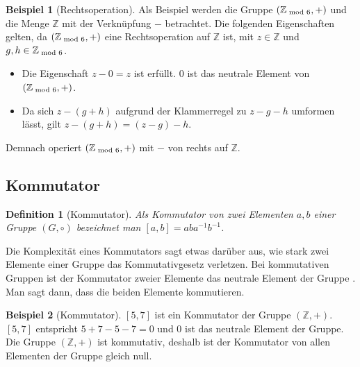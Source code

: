 \documentclass[12pt,a4paper, usenames, dvipsnames]{article}
\theoremstyle{mystyle}
\newtheorem{definition}{Definition}
\theoremstyle{definition}
\newtheorem{bsp}{Beispiel}[definition]
\begin{document}
\begin{bsp}[Rechtsoperation]

Als Beispiel werden die Gruppe $(\mathbb{Z}_{\hspace*{-0.3em}\mod 6}, +)$ und die Menge $\mathbb{Z}$ mit der Verknüpfung $-$ betrachtet. Die folgenden Eigenschaften gelten, da $(\mathbb{Z}_{\hspace*{-0.3em}\mod 6}, +)$ eine Rechtsoperation auf $\mathbb{Z}$ ist, mit $z \in  \mathbb{Z}$ und $g,h \in \mathbb{Z}_{\hspace*{-0.3em}\mod 6}$.
\begin{itemize}
\item Die Eigenschaft $z - 0 = z$ ist erfüllt. $0$ ist das neutrale Element von $(\mathbb{Z}_{\hspace*{-0.3em}\mod 6}, +)$.
\item Da sich $z-(g+h)$ aufgrund der Klammerregel zu $z-g-h$ umformen lässt, gilt $z-(g+h) = (z-g)-h$.
\end{itemize}
Demnach operiert $(\mathbb{Z}_{\hspace*{-0.3em}\mod 6}, +)$ mit $-$ von rechts auf $\mathbb{Z}$.

\end{bsp}

%
%
%
%
%
%
%
%
%
%
%
%

\subsection{Kommutator} 
 \label{Abschnitt_Kommutator}
 
 
\begin{definition}[Kommutator]
Als Kommutator von zwei Elementen $a, b$ einer Gruppe $(G, \circ)$  bezeichnet man $[a,b] = aba^{-1}b^{-1}$.
\end{definition} 
 
Die Komplexität eines Kommutators sagt etwas darüber aus, wie stark zwei Elemente einer Gruppe das Kommutativgesetz verletzen. Bei kommutativen Gruppen ist der Kommutator zweier Elemente das neutrale Element der Gruppe \cite{TD}. Man sagt dann, dass die beiden Elemente kommutieren. 


\begin{bsp}[Kommutator]

$[5,7]$ ist ein Kommutator der Gruppe $(\mathbb{Z}, +)$. $[5,7]$ entspricht $5+7-5-7 = 0$ und $0$ ist das neutrale Element der Gruppe. Die Gruppe $(\mathbb{Z}, +)$ ist kommutativ, deshalb ist der Kommutator von allen Elementen der Gruppe gleich null.

\end{bsp}
%
%
%
%
%
%
%
%
%
%
%
%
%
\end{document}
